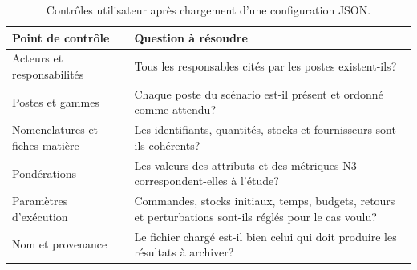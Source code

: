 \begin{table}[H]
  \centering
  \begin{tabularx}{\textwidth}{L{0.31\textwidth} Y}
    \toprule
    Point de contrôle & Question à résoudre \\
    \midrule
    Acteurs et responsabilités & Tous les responsables cités par les postes existent-ils? \\
    Postes et gammes & Chaque poste du scénario est-il présent et ordonné comme attendu? \\
    Nomenclatures et fiches matière & Les identifiants, quantités, stocks et fournisseurs sont-ils cohérents? \\
    Pondérations & Les valeurs des attributs et des métriques N3 correspondent-elles à l'étude? \\
    Paramètres d'exécution & Commandes, stocks initiaux, temps, budgets, retours et perturbations sont-ils réglés pour le cas voulu? \\
    Nom et provenance & Le fichier chargé est-il bien celui qui doit produire les résultats à archiver? \\
    \bottomrule
  \end{tabularx}
  \caption{Contrôles utilisateur après chargement d'une configuration JSON.}
  \label{tab:controle-apres-json}
\end{table}

